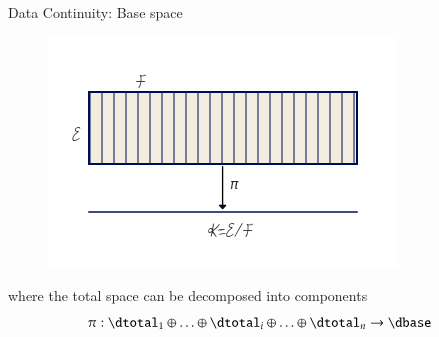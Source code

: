 \documentclass[xcolor={dvipsnames}, handout]{beamer}
\begin{document}
\begin{frame}{Data Continuity: Base space}
    \begin{figure}[H]
    \includegraphics[height=.5\textheight]{figures/math/k_qspace.png}
    \label{fig:base_space_div}
\end{figure}
where the total space can be decomposed into components 
\begin{equation}
    \pi:\dtotal_1\oplus\ldots\oplus \dtotal_i \oplus\ldots \oplus \dtotal_n \rightarrow \dbase
\end{equation}
\end{frame}
\end{document}
